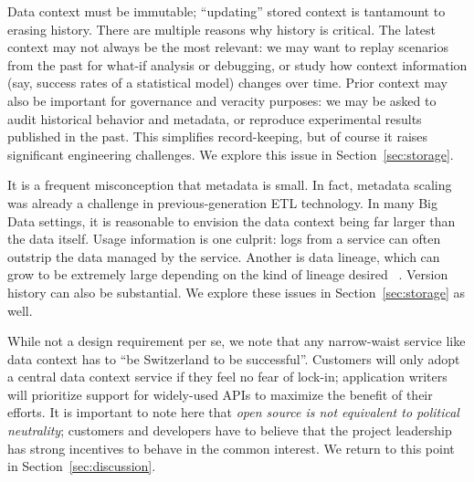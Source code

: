 \documentclass{sig-alternate}
\begin{document}
 Data context must be immutable; ``updating'' stored context is tantamount to erasing history. %
There are multiple reasons why history is critical. The latest context may not always be the most relevant: we may want to replay scenarios from the past for what-if analysis or debugging, or study how context information (say, success rates of a statistical model) changes over time. Prior context may also be important for governance and veracity purposes: we may be asked to audit historical behavior and metadata, or reproduce experimental results published in the past. This simplifies record-keeping, but of course it raises significant engineering challenges.  
We explore this issue in Section~\ref{sec:storage}.

 It is a frequent misconception that metadata is small. In fact, metadata scaling was already a challenge in previous-generation ETL technology. In many Big Data settings, it is reasonable to envision the data context being far larger than the data itself. Usage information is one culprit:  logs from a service can often outstrip the data managed by the service. Another is data lineage, which can grow to be extremely large
depending on the kind of lineage desired
~\cite{cheney2009provenance}.  Version history can also be substantial. 
We explore these issues in Section~\ref{sec:storage} as well.

  While not a design requirement per se, we note that any narrow-waist service like data context has to ``be Switzerland to be successful''.  Customers will only adopt a central data context service if they feel no fear of lock-in; application writers will prioritize support for widely-used APIs to maximize the benefit of their efforts. 
It is important to note here that \emph{open source is not equivalent to political neutrality}; customers and developers have to believe that the project leadership has strong incentives to behave in the common interest. We return to this point in Section~\ref{sec:discussion}.
\end{document}

